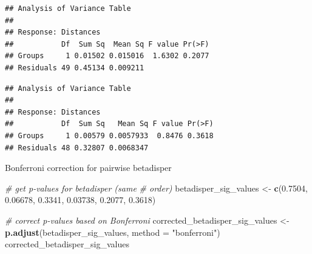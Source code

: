 \documentclass[]{article}
\newenvironment{Shaded}{\begin{snugshade}}{\end{snugshade}}
\newcommand{\KeywordTok}[1]{\textcolor[rgb]{0.13,0.29,0.53}{\textbf{#1}}}
\newcommand{\DataTypeTok}[1]{\textcolor[rgb]{0.13,0.29,0.53}{#1}}
\newcommand{\FloatTok}[1]{\textcolor[rgb]{0.00,0.00,0.81}{#1}}
\newcommand{\StringTok}[1]{\textcolor[rgb]{0.31,0.60,0.02}{#1}}
\newcommand{\CommentTok}[1]{\textcolor[rgb]{0.56,0.35,0.01}{\textit{#1}}}
\newcommand{\OperatorTok}[1]{\textcolor[rgb]{0.81,0.36,0.00}{\textbf{#1}}}
\newcommand{\NormalTok}[1]{#1}
\begin{document}
\begin{verbatim}
## Analysis of Variance Table
## 
## Response: Distances
##           Df  Sum Sq  Mean Sq F value Pr(>F)
## Groups     1 0.01502 0.015016  1.6302 0.2077
## Residuals 49 0.45134 0.009211
\end{verbatim}

\begin{Shaded}
\end{Shaded}

\begin{verbatim}
## Analysis of Variance Table
## 
## Response: Distances
##           Df  Sum Sq   Mean Sq F value Pr(>F)
## Groups     1 0.00579 0.0057933  0.8476 0.3618
## Residuals 48 0.32807 0.0068347
\end{verbatim}

Bonferroni correction for pairwise betadisper

\begin{Shaded}
\begin{Highlighting}[]
\CommentTok{# get p-values for betadisper (same}
\CommentTok{# order)}
\NormalTok{betadisper_sig_values <-}\StringTok{ }\KeywordTok{c}\NormalTok{(}\FloatTok{0.7504}\NormalTok{, }\FloatTok{0.06678}\NormalTok{, }
    \FloatTok{0.3341}\NormalTok{, }\FloatTok{0.03738}\NormalTok{, }\FloatTok{0.2077}\NormalTok{, }\FloatTok{0.3618}\NormalTok{)}

\CommentTok{# correct p-values based on Bonferroni}
\NormalTok{corrected_betadisper_sig_values <-}\StringTok{ }\KeywordTok{p.adjust}\NormalTok{(betadisper_sig_values, }
    \DataTypeTok{method =} \StringTok{"bonferroni"}\NormalTok{)}
\NormalTok{corrected_betadisper_sig_values}
\end{Highlighting}
\end{Shaded}
\end{document}
